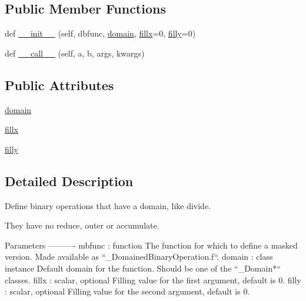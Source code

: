 \subsection*{Public Member Functions}
\begin{DoxyCompactItemize}
\item 
def \hyperlink{classnumpy_1_1ma_1_1core_1_1__DomainedBinaryOperation_a16bb9ffe3b0bc68bd6e836e61142facc}{\+\_\+\+\_\+init\+\_\+\+\_\+} (self, dbfunc, \hyperlink{classnumpy_1_1ma_1_1core_1_1__DomainedBinaryOperation_aa427c233a0b325090eb04de5f99f7515}{domain}, \hyperlink{classnumpy_1_1ma_1_1core_1_1__DomainedBinaryOperation_aec68d6fed6d004e651dc4b9ec193edb3}{fillx}=0, \hyperlink{classnumpy_1_1ma_1_1core_1_1__DomainedBinaryOperation_aee133906481810f094e3080e03db5e50}{filly}=0)
\item 
def \hyperlink{classnumpy_1_1ma_1_1core_1_1__DomainedBinaryOperation_a8962b38091bb7fdfda0de6b016722f15}{\+\_\+\+\_\+call\+\_\+\+\_\+} (self, a, b, args, kwargs)
\end{DoxyCompactItemize}
\subsection*{Public Attributes}
\begin{DoxyCompactItemize}
\item 
\hyperlink{classnumpy_1_1ma_1_1core_1_1__DomainedBinaryOperation_aa427c233a0b325090eb04de5f99f7515}{domain}
\item 
\hyperlink{classnumpy_1_1ma_1_1core_1_1__DomainedBinaryOperation_aec68d6fed6d004e651dc4b9ec193edb3}{fillx}
\item 
\hyperlink{classnumpy_1_1ma_1_1core_1_1__DomainedBinaryOperation_aee133906481810f094e3080e03db5e50}{filly}
\end{DoxyCompactItemize}


\subsection{Detailed Description}
\begin{DoxyVerb}Define binary operations that have a domain, like divide.

They have no reduce, outer or accumulate.

Parameters
----------
mbfunc : function
    The function for which to define a masked version. Made available
    as ``_DomainedBinaryOperation.f``.
domain : class instance
    Default domain for the function. Should be one of the ``_Domain*``
    classes.
fillx : scalar, optional
    Filling value for the first argument, default is 0.
filly : scalar, optional
    Filling value for the second argument, default is 0.\end{DoxyVerb}
 

